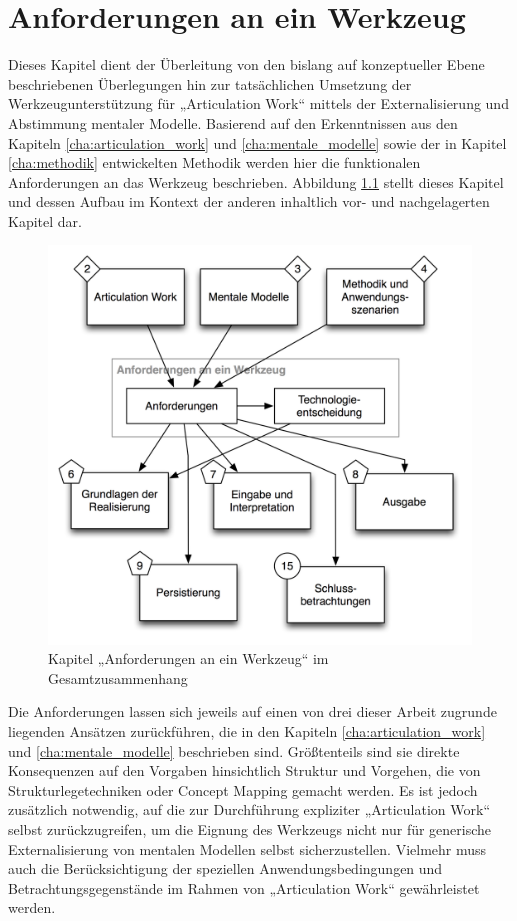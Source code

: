 
\chapter{Anforderungen an ein Werkzeug} %
\label{cha:anforderungen}

Dieses Kapitel dient der Überleitung von den bislang auf konzeptueller Ebene beschriebenen Überlegungen hin zur tatsächlichen Umsetzung der Werkzeugunterstützung für „Articulation Work“ mittels der Externalisierung und Abstimmung mentaler Modelle. Basierend auf den Erkenntnissen aus den Kapiteln \ref{cha:articulation_work} und \ref{cha:mentale_modelle} sowie der in Kapitel \ref{cha:methodik} entwickelten Methodik werden hier die funktionalen Anforderungen an das Werkzeug beschrieben. Abbildung \ref{fig:img_Kontextgrafiken_k5} stellt dieses Kapitel und dessen Aufbau im Kontext der anderen inhaltlich vor- und nachgelagerten Kapitel dar.


\begin{figure}[htbp]
	\centering
		\includegraphics[scale=0.6]{img/Kontextgrafiken/k5.png}
	\caption{Kapitel „Anforderungen an ein Werkzeug“ im Gesamtzusammenhang}
	\label{fig:img_Kontextgrafiken_k5}
\end{figure}

Die Anforderungen lassen sich jeweils auf einen von drei dieser Arbeit zugrunde liegenden Ansätzen zurückführen, die in den Kapiteln \ref{cha:articulation_work} und \ref{cha:mentale_modelle} beschrieben sind. Größtenteils sind sie direkte Konsequenzen auf den Vorgaben hinsichtlich Struktur und Vorgehen, die von Strukturlegetechniken oder Concept Mapping gemacht werden. Es ist jedoch zusätzlich notwendig, auf die zur Durchführung expliziter „Articulation Work“ selbst zurückzugreifen, um die Eignung des Werkzeugs nicht nur für generische Externalisierung von mentalen Modellen selbst sicherzustellen. Vielmehr muss auch die Berücksichtigung der speziellen Anwendungsbedingungen und Betrachtungsgegenstände im Rahmen von „Articulation Work“ gewährleistet werden.


